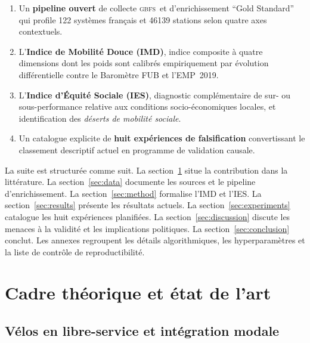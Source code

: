 \documentclass[11pt,a4paper]{article}
\newcommand{\GBFS}{\textsc{gbfs}\xspace}
\begin{document}
\begin{contribution}
\begin{enumerate}[leftmargin=*,itemsep=0.2em]
    \item Un \textbf{pipeline ouvert} de collecte \GBFS\ et
    d'enrichissement \enquote{Gold Standard} qui profile \num{122}
    systèmes français et \num{46139} stations selon quatre axes
    contextuels.
    \item L'\textbf{Indice de Mobilité Douce (IMD)}, indice
    composite à quatre dimensions dont les poids sont calibrés
    empiriquement par évolution différentielle contre le Baromètre
    FUB et l'EMP~2019.
    \item L'\textbf{Indice d'Équité Sociale (IES)}, diagnostic
    complémentaire de sur- ou sous-performance relative aux
    conditions socio-économiques locales, et identification des
    \emph{déserts de mobilité sociale}.
    \item Un catalogue explicite de \textbf{huit expériences de
    falsification} convertissant le classement descriptif actuel
    en programme de validation causale.
\end{enumerate}
\end{contribution}

La suite est structurée comme suit. La
section~\ref{sec:related} situe la contribution dans la littérature.
La section~\ref{sec:data} documente les sources et le pipeline
d'enrichissement. La section~\ref{sec:method} formalise l'IMD et
l'IES. La section~\ref{sec:results} présente les résultats actuels.
La section~\ref{sec:experiments} catalogue les huit expériences
planifiées. La section~\ref{sec:discussion} discute les menaces à
la validité et les implications politiques. La
section~\ref{sec:conclusion} conclut. Les annexes regroupent les
détails algorithmiques, les hyperparamètres et la liste de
contrôle de reproductibilité.

\section{Cadre théorique et état de l'art}
\label{sec:related}

\subsection{Vélos en libre-service et intégration modale}
\end{document}

